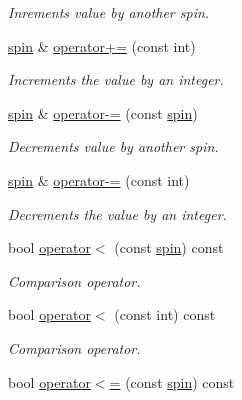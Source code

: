 \begin{DoxyCompactItemize}
\begin{DoxyCompactList}\small\item\em Inrements value by another spin. \end{DoxyCompactList}\item 
\hypertarget{a00501_ae268507e94fd756dd87d3bdbbefda66b}{\hyperlink{a00501}{spin} \& \hyperlink{a00501_ae268507e94fd756dd87d3bdbbefda66b}{operator+=} (const int)}\label{a00501_ae268507e94fd756dd87d3bdbbefda66b}

\begin{DoxyCompactList}\small\item\em Increments the value by an integer. \end{DoxyCompactList}\item 
\hypertarget{a00501_ae3480265f0f41e69b1e5b2754710061a}{\hyperlink{a00501}{spin} \& \hyperlink{a00501_ae3480265f0f41e69b1e5b2754710061a}{operator-\/=} (const \hyperlink{a00501}{spin})}\label{a00501_ae3480265f0f41e69b1e5b2754710061a}

\begin{DoxyCompactList}\small\item\em Decrements value by another spin. \end{DoxyCompactList}\item 
\hypertarget{a00501_aa38d773c35cccc858884e1e09f6f6d85}{\hyperlink{a00501}{spin} \& \hyperlink{a00501_aa38d773c35cccc858884e1e09f6f6d85}{operator-\/=} (const int)}\label{a00501_aa38d773c35cccc858884e1e09f6f6d85}

\begin{DoxyCompactList}\small\item\em Decrements the value by an integer. \end{DoxyCompactList}\item 
\hypertarget{a00501_ae038724721dc3e9d5de32359487da454}{bool \hyperlink{a00501_ae038724721dc3e9d5de32359487da454}{operator$<$} (const \hyperlink{a00501}{spin}) const }\label{a00501_ae038724721dc3e9d5de32359487da454}

\begin{DoxyCompactList}\small\item\em Comparison operator. \end{DoxyCompactList}\item 
\hypertarget{a00501_ad1fb7b89bb8acdbc804f1ca154b375a8}{bool \hyperlink{a00501_ad1fb7b89bb8acdbc804f1ca154b375a8}{operator$<$} (const int) const }\label{a00501_ad1fb7b89bb8acdbc804f1ca154b375a8}

\begin{DoxyCompactList}\small\item\em Comparison operator. \end{DoxyCompactList}\item 
\hypertarget{a00501_a3dd8f6e42dd7d196ee201ff2c35ed418}{bool \hyperlink{a00501_a3dd8f6e42dd7d196ee201ff2c35ed418}{operator$<$=} (const \hyperlink{a00501}{spin}) const }\label{a00501_a3dd8f6e42dd7d196ee201ff2c35ed418}


\end{DoxyCompactItemize}
